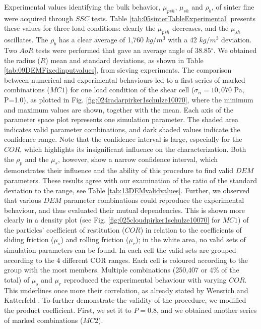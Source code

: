 Experimental values identifying the bulk behavior, $\mu_{psh}$, $\mu_{sh}$ and $\rho_{b}$, 
of sinter fine were acquired through $SSC$ tests. 
Table \ref{tab:05sinterTableExperimental} presents
these values for three load conditions: clearly the $\mu_{psh}$ decreases, and 
the $\mu_{sh}$ oscillates.
The $\rho_b$ has a clear average of 1,760 $kg/m^3$ with a 42 
$kg/m^3$ deviation.
Two $AoR$ tests were performed that gave an average angle of
38.85$^\circ$.
We obtained the radius ($R$) mean and standard
deviations, as shown in Table
\ref{tab:09DEMFixedinputvalues}, from sieving experiments.
The comparison between numerical and experimental behaviours led to a first
series of marked combinations ($MC1$) for one load condition of
the shear cell ($\sigma_n=10,070$ Pa, P=1.0), as plotted in Fig.
\ref{fig:024radarpirker1schulze10070}, where 
the minimum and maximum values are shown, together with the mean. 
Each axis of the parameter space plot represents one simulation parameter.
The shaded area indicates valid parameter combinations, and dark shaded
values indicate the confidence range.
Note that the confidence interval is large, 
especially for the $COR$, which highlights its insignificant influence on the
characterization.
Both the $\rho_p$  and the $\mu_s$, however, show a narrow confidence interval, 
which demonstrates their influence and the ability of this procedure to find
valid $DEM$ parameters.
These results agree with our examination of the ratio of the standard deviation
to the range, see Table \ref{tab:13DEMvalidvalues}.
Further, we observed that various $DEM$ parameter
combinations could reproduce the experimental behaviour, and thus evaluated
their mutual dependencies.
This is shown more clearly in a density plot (see Fig. 
\ref{fig:025cloudpirker1schulze10070} for $MC1$) 
of the particles' coefficient of restitution ($COR$) in relation to
the coefficients of sliding friction ($\mu_s$) and rolling friction ($\mu_r$); 
in the white area, no valid sets of simulation parameters can be found.
In each cell the valid sets are grouped according to the 4 different COR
ranges.
Each cell is coloured according to the group with the most members.
Multiple
combinations (250,407 or 4\% of the total) of $\mu_s$ and $\mu_r$ reproduced
the experimental behaviour with varying $COR$.
This underlines once more their correlation, as already stated by Wensrich and 
Katterfeld \cite{RefWorks:87}.
To further demonstrate the validity of the procedure, we modified the product
coefficient. 
First, we set it to $P=0.8$, and we obtained another
series of marked combinations ($MC2$).
